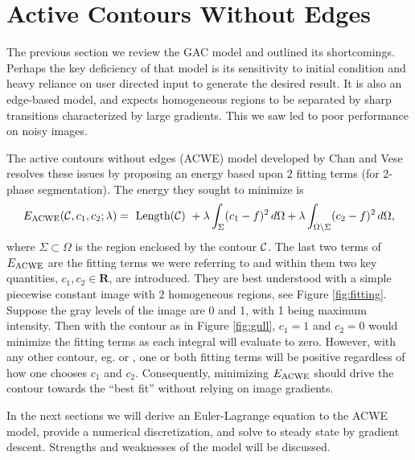 \chapter{Active Contours Without Edges}
\label{ch:acwe}
The previous section we review the GAC model and outlined its shortcomings. Perhaps the key deficiency of that model is its sensitivity to initial condition and heavy reliance on user directed input to generate the desired result. It is also an edge-based model, and expects homogeneous regions to be separated by sharp transitions characterized by large gradients. This we saw led to poor performance on noisy images.

The active contours without edges (ACWE) model developed by Chan and Vese \cite{chan2001active} resolves these issues by proposing an energy based upon 2 fitting terms (for 2-phase segmentation). The energy they sought to minimize is 
\begin{align}
E_\textrm{ACWE}(\mathcal{C}, c_1, c_2; \lambda)
= \textrm{ Length($\mathcal{C}$) } 
+ \lambda \int_{\Sigma} (c_1 - f )^2 \,d\Omega
+ \lambda \int_{\Omega \setminus \Sigma} (c_2 - f )^2 \,d\Omega,
\end{align}
where $\Sigma \subset \Omega$ is the region enclosed by the contour $\mathcal{C}$.
The last two terms of $E_\textrm{ACWE}$ are the fitting terms we were referring to and within them two key quantities, $c_1, c_2 \in \mathbf{R}$, are introduced. They are best understood with a simple piecewise constant image with 2 homogeneous regions, see Figure \ref{fig:fitting}. Suppose the gray levels of the image are 0 and 1, with 1 being maximum intensity. Then with the contour as in Figure \ref{fig:gull}, $c_1 = 1$ and $c_2 = 0$ would minimize the fitting terms as each integral will evaluate to zero. However, with any other contour, eg.  or , one or both fitting terms will be positive regardless of how one chooses $c_1$ and $c_2$. Consequently, minimizing $E_\textrm{ACWE}$ should drive the contour towards the ``best fit'' without relying on image gradients.

In the next sections we will derive an Euler-Lagrange equation to the ACWE model, provide a numerical discretization, and solve to steady state by gradient descent. Strengths and weaknesses of the model will be discussed.

